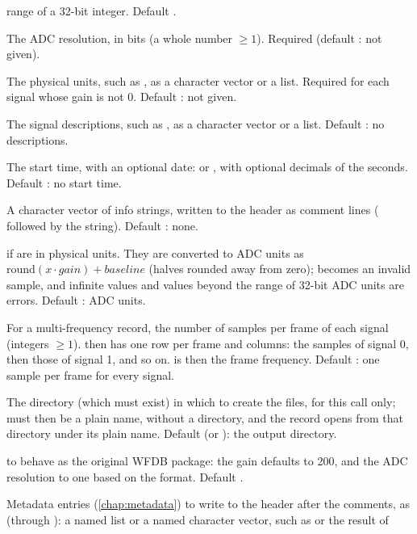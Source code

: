 \begin{params}
  range of a 32-bit integer. Default .
\item[adcres] The ADC resolution, in bits (a whole number $\ge 1$). Required (default
  : not given).
\item[units] The physical units, such as , as a character vector or a list.
  Required for each signal whose gain is not 0. Default : not given.
\item[names] The signal descriptions, such as , as a character vector or a
  list. Default : no descriptions.
\item[base\_time] The start time, with an optional date:  or
  , with optional decimals of the seconds. Default
  : no start time.
\item[comments] A character vector of info strings, written to the header as comment
  lines ( followed by the string). Default : none.
\item[physical]  if  are in physical units. They are converted
  to ADC units as $\mathrm{round}(x \cdot \mathit{gain}) + \mathit{baseline}$ (halves
  rounded away from zero);  becomes an invalid sample, and infinite values and
  values beyond the range of 32-bit ADC units are errors. Default : ADC units.
\item[samps\_per\_frame] For a multi-frequency record, the number of samples per frame of
  each signal (integers $\ge 1$).  then has one row per frame and
   columns: the samples of signal 0, then those of signal 1,
  and so on.  is then the frame frequency. Default : one sample per
  frame for every signal.
\item[dir] The directory (which must exist) in which to create the files, for this call
  only;  must then be a plain name, without a directory, and the record
  opens from that directory under its plain name. Default  (or ): the
  output directory.
\item[legacy]  to behave as the original WFDB package: the gain defaults to
  200, and the ADC resolution to one based on the format. Default .
\item[metadata] Metadata entries (\cref{chap:metadata}) to write to the header after the
  comments, as  (through ): a named list or a named
  character vector, such as  or the result of

\end{params}
